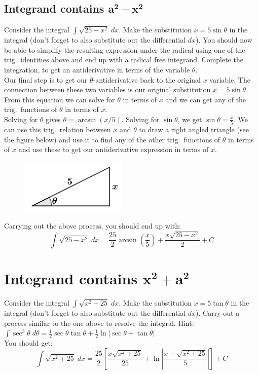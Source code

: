 \documentclass[12pt,letterpaper,fleqn]{article}
\theoremstyle{definition}
\begin{document}
\subsection*{Integrand contains $\pmb{a^2 - x^2}$}
Consider the integral $\int\sqrt{25 - x^2}\;dx$. Make the substitution $x = 5\sin\theta$ in the integral (don't forget to also substitute out the differential $dx$). You should now be able to simplify the resulting expression under the radical using one of the trig.\ identities above and end up with a radical free integrand. Complete the integration, to get an antiderivative in terms of the variable $\theta$.\\[1.5ex] Our final step is to get our $\theta$-antiderivative back to the original $x$ variable. The connection between these two variables is our original substitution $x = 5\sin\theta$. From this equation we can solve for $\theta$ in terms of $x$ and we can get any of the trig.\ functions of $\theta$ in terms of $x$.\\[1.5ex] Solving for $\theta$ gives $\theta = \arcsin(x/5)$. Solving for $\sin\theta$, we get $\sin\theta = \frac{x}{5}$. We can use this trig.\ relation between $x$ and $\theta$ to draw a right angled triangle (see the figure below) and use it to find any of the other trig.\ functions of $\theta$ in terms of $x$ and use these to get our antiderivative expression in terms of $x$.
\begin{figure}[!htb]
	\centering
	\includegraphics[width=2in]{img/trig_triangle.png}
\end{figure}
Carrying out the above process, you should end up with:
\begin{equation*}
  \int\sqrt{25 - x^2}\;dx = \frac{25}{2}\arcsin\left(\frac{x}{5}\right) + \frac{x\sqrt{25-x^2}}{2} + C
\end{equation*}
\newpage
\section*{Integrand contains $\pmb{x^2 + a^2}$}
Consider the integral $\int\sqrt{x^2 + 25}\;dx$. Make the substitution $x = 5\tan\theta$ in the integral (don't forget to also substitute out the differential $dx$). Carry out a process similar to the one above to resolve the integral. Hint: $\int\sec^3\theta\;d\theta = \frac{1}{2}\sec\theta \tan\theta + \frac{1}{2}\ln|\sec\theta + \tan\theta|$\\[1.5ex] You should get:
\begin{equation*}
  \int\sqrt{x^2 + 25}\;dx = \frac{25}{2}\left[\frac{x\sqrt{x^2+25}}{25} + \ln\left|\frac{x + \sqrt{x^2+25}}{5}\right|\right] + C
\end{equation*}
\end{document}
